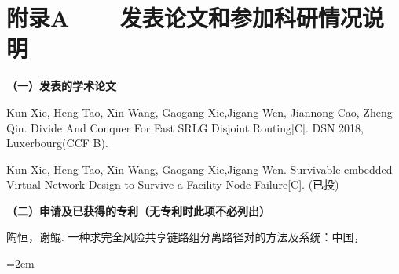 
\chapter*{附录A~~~~发表论文和参加科研情况说明}
\setlength{\parindent}{0em}
\textbf{（一）发表的学术论文}
\begin{publist}
\item Kun Xie, Heng Tao, Xin Wang, Gaogang Xie,Jigang Wen, Jiannong Cao, Zheng Qin. Divide And Conquer For Fast SRLG Disjoint Routing[C]. DSN 2018, Luxerbourg(CCF B).
\item Kun Xie, Heng Tao, Xin Wang, Gaogang Xie,Jigang Wen. Survivable embedded Virtual Network Design to Survive a Facility Node Failure[C]. (已投)
\end{publist}

\vspace*{1em}
\textbf{（二）申请及已获得的专利（无专利时此项不必列出）}
\begin{publist}
\item 陶恒，谢鲲. 一种求完全风险共享链路组分离路径对的方法及系统：中国，%
\end{publist}
\vfill
{}\hangindent=2em\noindent

\setlength{\parindent}{2em}
